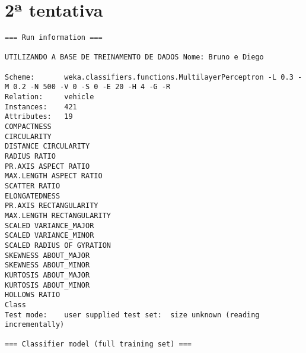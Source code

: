 \documentclass[
	article,			%
	11pt,				%
	oneside,			%
	a4paper,			%
	english,			%
	brazil,				%
	sumario=tradicional
	]{abntex2}
\begin{document}
\section{2ª tentativa}

\begin{lstlisting}
=== Run information ===

UTILIZANDO A BASE DE TREINAMENTO DE DADOS Nome: Bruno e Diego

Scheme:       weka.classifiers.functions.MultilayerPerceptron -L 0.3 -M 0.2 -N 500 -V 0 -S 0 -E 20 -H 4 -G -R
Relation:     vehicle
Instances:    421
Attributes:   19
COMPACTNESS
CIRCULARITY
DISTANCE CIRCULARITY
RADIUS RATIO
PR.AXIS ASPECT RATIO
MAX.LENGTH ASPECT RATIO
SCATTER RATIO
ELONGATEDNESS
PR.AXIS RECTANGULARITY
MAX.LENGTH RECTANGULARITY
SCALED VARIANCE_MAJOR
SCALED VARIANCE_MINOR
SCALED RADIUS OF GYRATION
SKEWNESS ABOUT_MAJOR
SKEWNESS ABOUT_MINOR
KURTOSIS ABOUT_MAJOR
KURTOSIS ABOUT_MINOR
HOLLOWS RATIO
Class
Test mode:    user supplied test set:  size unknown (reading incrementally)

=== Classifier model (full training set) ===


\end{lstlisting}
\end{document}
